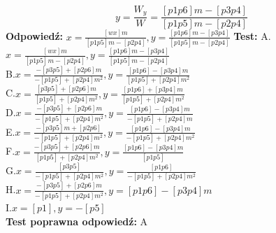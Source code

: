 \documentclass[12pt, a4paper]{article}
\theoremstyle{definition} %
\newcommand{\rozwStop}{\newline}                                            %
\newcommand{\odpStart}{\noindent \textbf{Odpowiedź:}\newline}    %
\newcommand{\odpStop}{\newline}                                             %
\newcommand{\testStart}{\noindent \textbf{Test:}\newline} %
\newcommand{\testStop}{\newline} %
\newcommand{\kluczStart}{\noindent \textbf{Test poprawna odpowiedź:}\newline} %
\newcommand{\kluczStop}{\newline} %
\begin{document}
$$y=\frac{W_{y}}{W}=\frac{[p1p6]m-[p3p4]}{[p1p5]m-[p2p4]}$$
\rozwStop
\odpStart
$x=\frac{[wx]m}{[p1p5]m-[p2p4]}, y=\frac{[p1p6]m-[p3p4]}{[p1p5]m-[p2p4]}$
\odpStop
\testStart
A.$x=\frac{[wx]m}{[p1p5]m-[p2p4]}, y=\frac{[p1p6]m-[p3p4]}{[p1p5]m-[p2p4]}$\\
B.$x=\frac{-[p3p5]+[p2p6]m}{-[p1p5]+[p2p4]m^{2}}, y=\frac{[p1p6]-[p3p4]m}{[p1p5]+[p2p4]m^{2}}$\\
C.$x=\frac{[p3p5]+[p2p6]m}{[p1p5]+[p2p4]m^{2}}, y=\frac{[p1p6]+[p3p4]m}{[p1p5]+[p2p4]m^{2}}$\\
D.$x=\frac{-[p3p5]+[p2p6]m}{-[p1p5]+[p2p4]m^{2}}, y=\frac{[p1p6]-[p3p4]m}{-[p1p5]+[p2p4]m}$\\
E.$x=\frac{-[p3p5]m+[p2p6]}{-[p1p5]+[p2p4]m^{2}}, y=\frac{[p1p6]-[p3p4]m}{-[p1p5]+[p2p4]m^{2}}$\\
F.$x=\frac{-[p3p5]+[p2p6]m}{[p1p5]+[p2p4]m^{2}}, y=\frac{[p1p6]-[p3p4]m}{[p1p5]}$\\
G.$x=\frac{[p3p5]}{-[p1p5]+[p2p4]m^{2}}, y=\frac{[p1p6]}{-[p1p5]+[p2p4]m^{2}}$\\
H.$x=\frac{-[p3p5]+[p2p6]m}{-[p1p5]+[p2p4]m^{2}}, y=[p1p6]-[p3p4]m$\\
I.$x=[p1], y=-[p5]$\\
\testStop
\kluczStart
A
\kluczStop
\end{document}
